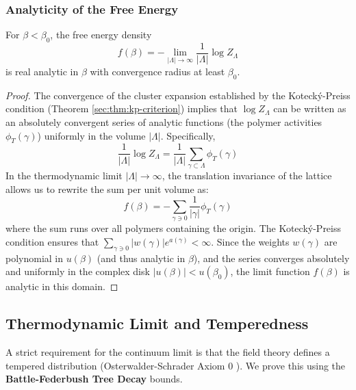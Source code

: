 \subsubsection{Analyticity of the Free Energy}

\begin{theorem}\label{sec:thm:analyticity-strong}
For $\beta < \beta_0$, the free energy density
\begin{equation}
    f(\beta) = -\lim_{|\Lambda| \to \infty} \frac{1}{|\Lambda|} \log Z_\Lambda
\end{equation}
is real analytic in $\beta$ with convergence radius at least $\beta_0$.
\end{theorem}

\begin{proof}
The convergence of the cluster expansion established by the Koteck\'y-Preiss condition (Theorem \ref{sec:thm:kp-criterion}) implies that $\log Z_\Lambda$ can be written as an absolutely convergent series of analytic functions (the polymer activities $\phi_T(\gamma)$) uniformly in the volume $|\Lambda|$.
Specifically,
\begin{equation}
    \frac{1}{|\Lambda|} \log Z_\Lambda = \frac{1}{|\Lambda|} \sum_{\gamma \subset \Lambda} \phi_T(\gamma)
\end{equation}
In the thermodynamic limit $|\Lambda| \to \infty$, the translation invariance of the lattice allows us to rewrite the sum per unit volume as:
\begin{equation}
    f(\beta) = -\sum_{\gamma \ni 0} \frac{1}{|\gamma|} \phi_T(\gamma)
\end{equation}
where the sum runs over all polymers containing the origin. The Koteck\'y-Preiss condition ensures that $\sum_{\gamma \ni 0} |w(\gamma)| e^{a(\gamma)} < \infty$. Since the weights $w(\gamma)$ are polynomial in $u(\beta)$ (and thus analytic in $\beta$), and the series converges absolutely and uniformly in the complex disk $|u(\beta)| < u(\beta_0)$, the limit function $f(\beta)$ is analytic in this domain.
\end{proof}

\subsection{Thermodynamic Limit and Temperedness}

A strict requirement for the continuum limit is that the field theory defines a tempered distribution (Osterwalder-Schrader Axiom 0 \cite{osterwalder1973axioms}). We prove this using the \textbf{Battle-Federbush Tree Decay} bounds.


